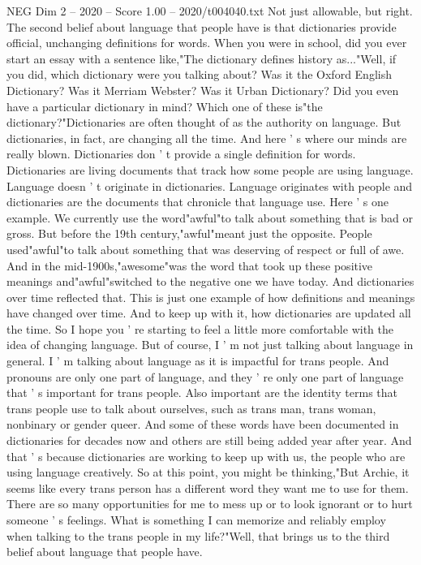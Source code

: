 \begin{textsample}{NEG Dim 2 – 2020 – Score 1.00 – 2020/t004040.txt}
Not just allowable, but right.
The second belief about language that people have is that dictionaries provide official, unchanging definitions for words.
When you were in school, did you ever start an essay with a sentence like,"The dictionary defines history as..."Well, if you did, which dictionary were you talking about?
Was it the Oxford English Dictionary?
Was it Merriam Webster?
Was it Urban Dictionary?
Did you even have a particular dictionary in mind?
Which one of these is"the dictionary?"Dictionaries are often thought of as the authority on language.
But dictionaries, in fact, are changing all the time.
And here ' s where our minds are really blown.
Dictionaries don ' t provide a single definition for words.
Dictionaries are living documents that track how some people are using language.
Language doesn ' t originate in dictionaries.
Language originates with people and dictionaries are the documents that chronicle that language use.
Here ' s one example.
We currently use the word"awful"to talk about something that is bad or gross.
But before the 19th century,"awful"meant just the opposite.
People used"awful"to talk about something that was deserving of respect or full of awe.
And in the mid-1900s,"awesome"was the word that took up these positive meanings and"awful"switched to the negative one we have today.
And dictionaries over time reflected that.
This is just one example of how definitions and meanings have changed over time.
And to keep up with it, how dictionaries are updated all the time.
So I hope you ' re starting to feel a little more comfortable with the idea of changing language.
But of course, I ' m not just talking about language in general.
I ' m talking about language as it is impactful for trans people.
And pronouns are only one part of language, and they ' re only one part of language that ' s important for trans people.
Also important are the identity terms that trans people use to talk about ourselves, such as trans man, trans woman, nonbinary or gender queer.
And some of these words have been documented in dictionaries for decades now and others are still being added year after year.
And that ' s because dictionaries are working to keep up with us, the people who are using language creatively.
So at this point, you might be thinking,"But Archie, it seems like every trans person has a different word they want me to use for them.
There are so many opportunities for me to mess up or to look ignorant or to hurt someone ' s feelings.
What is something I can memorize and reliably employ when talking to the trans people in my life?"Well, that brings us to the third belief about language that people have.

\end{textsample}
